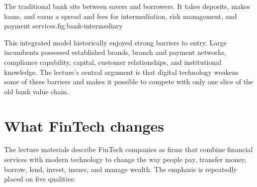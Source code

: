 \begin{utpfig}{The traditional bank sits between savers and borrowers. It takes deposits, makes loans, and earns a spread and fees for intermediation, risk management, and payment services.}{fig:bank-intermediary}
\end{utpfig}

This integrated model historically enjoyed strong barriers to entry. Large incumbents possessed established brands, branch and payment networks, compliance capability, capital, customer relationships, and institutional knowledge. The lecture's central argument is that digital technology weakens some of these barriers and makes it possible to compete with only one slice of the old bank value chain.

\section{What FinTech changes}

The lecture materials describe FinTech companies as firms that combine financial services with modern technology to change the way people pay, transfer money, borrow, lend, invest, insure, and manage wealth. The emphasis is repeatedly placed on five qualities:

